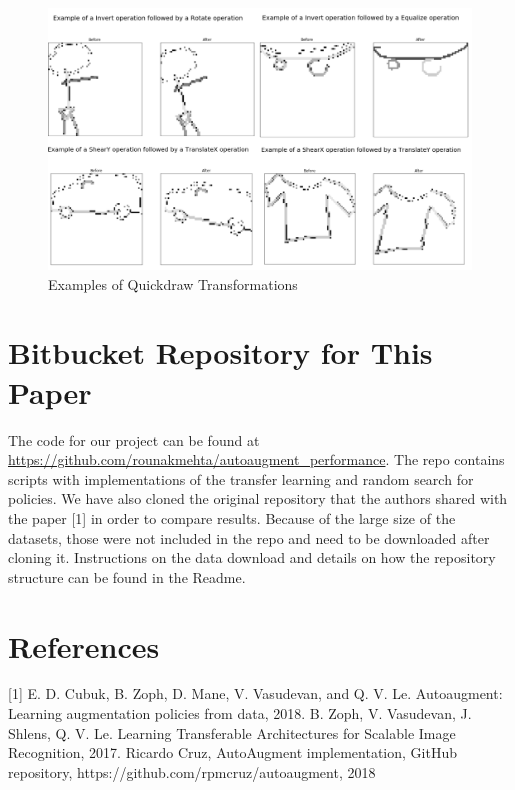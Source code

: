 \documentclass[10pt,twocolumn,letterpaper]{article}
\begin{document}
\begin{figure}[bhp]
\includegraphics[width=\columnwidth]{quickdraw_compiled_transform_exmples.png}
\caption{Examples of Quickdraw Transformations}
\end{figure}


\section{Bitbucket Repository for This Paper}

The code for our project can be found at \url{https://github.com/rounakmehta/autoaugment_performance}. The repo contains scripts with implementations of the transfer learning and random search for policies. We have also cloned the original repository that the authors shared with the paper [1] in order to compare results. Because of the large size of the datasets, those were not included in the repo and need to be downloaded after cloning it. Instructions on the data download and details on how the repository structure can be found in the Readme.  

\section{References}

[1]  E. D. Cubuk, B. Zoph, D. Mane, V. Vasudevan, and Q. V. Le. Autoaugment:   Learning  augmentation  policies  from  data, 2018. \newline
[2] B. Zoph, V. Vasudevan, J. Shlens, Q. V. Le. Learning Transferable Architectures for Scalable Image Recognition, 2017. \newline
[3] Ricardo Cruz, AutoAugment implementation, GitHub repository, https://github.com/rpmcruz/autoaugment, 2018 \newline

{\small


}
\end{document}
